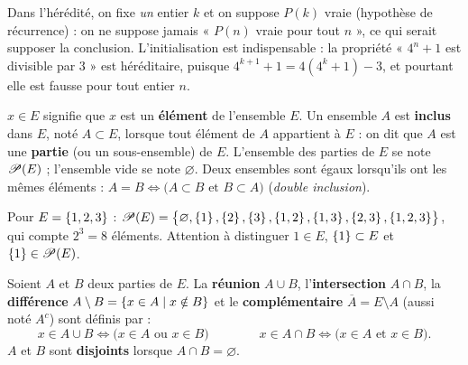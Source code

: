 \begin{attention}
Dans l'hérédité, on fixe \emph{un} entier $k$ et on suppose $P(k)$ vraie
(hypothèse de récurrence) : on ne suppose jamais « $P(n)$ vraie pour tout
$n$ », ce qui serait supposer la conclusion. L'initialisation est
indispensable : la propriété « $4^{n}+1$ est divisible par $3$ » est
héréditaire, puisque $4^{k+1}+1=4(4^{k}+1)-3$, et pourtant elle est fausse
pour tout entier $n$.
\end{attention}


\begin{definition}
$x\in E$ signifie que $x$ est un \textbf{élément} de l'ensemble $E$.
Un ensemble $A$ est \textbf{inclus} dans $E$, noté $A\subset E$, lorsque tout
élément de $A$ appartient à $E$ : on dit que $A$ est une \textbf{partie} (ou
un sous-ensemble) de $E$. L'ensemble des parties de $E$ se note
$\mathscr{P}(E)$ ; l'ensemble vide se note $\varnothing$.
Deux ensembles sont égaux lorsqu'ils ont les mêmes éléments :
$A=B\iff\bigl(A\subset B\text{ et }B\subset A\bigr)$ (\emph{double inclusion}).
\end{definition}

\begin{exemple}
Pour $E=\left\{1,2,3\right\}$ : $\mathscr{P}(E)=\bigl\{\varnothing,\left\{1\right\},\left\{2\right\},\left\{3\right\},
\left\{1,2\right\},\left\{1,3\right\},\left\{2,3\right\},\left\{1,2,3\right\}\bigr\}$, qui compte $2^{3}=8$ éléments.
Attention à distinguer $1\in E$, $\left\{1\right\}\subset E$ et $\left\{1\right\}\in\mathscr{P}(E)$.
\end{exemple}

\begin{definition}
Soient $A$ et $B$ deux parties de $E$.
La \textbf{réunion} $A\cup B$, l'\textbf{intersection} $A\cap B$, la
\textbf{différence} $A\setminus B=\left\{x\in A \mid x\notin B\right\}$ et le
\textbf{complémentaire} $\overline{A}=E\setminus A$ (aussi noté $A^{c}$)
sont définis par :
\[
  x\in A\cup B\iff\bigl(x\in A\text{ ou }x\in B\bigr)
  \qquad\qquad
  x\in A\cap B\iff\bigl(x\in A\text{ et }x\in B\bigr).
\]
$A$ et $B$ sont \textbf{disjoints} lorsque $A\cap B=\varnothing$.
\end{definition}

\begin{center}
\hfill
{}\hfill
{}\hfill
{}
\end{center}

